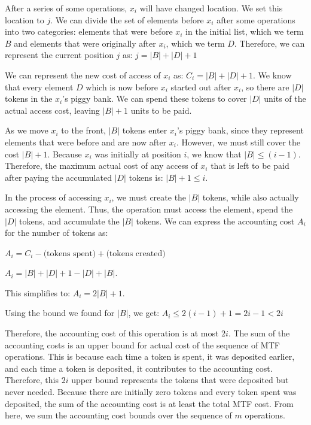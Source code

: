 \documentclass[11pt]{article}
\begin{document}
\begin{enumerate}
After a series of some operations, $x_i$ will have changed location. We set this location to $j$. 
We can divide the set of elements before $x_i$ after some operations into two categories: 
elements that were before $x_i$ in the initial list, which we term $B$ and elements that were originally after $x_i$, which we term $D$. 
Therefore, we can represent the current position $j$ as: $j = |B| + |D| + 1$

We can represent the new cost of access of $x_i$ as: $C_i = |B| + |D| + 1$. 
We know that every element $D$ which is now before $x_i$ started out after $x_i$, so there are $|D|$ tokens in the $x_i$'s piggy bank. 
We can spend these tokens to cover $|D|$ units of the actual access cost, leaving $|B| + 1$ units to be paid. 

As we move $x_i$ to the front, $|B|$ tokens enter $x_i$'s piggy bank, since they represent elements that were before and are now after $x_i$. 
However, we must still cover the cost $|B| + 1$. Because $x_i$ was initially at position $i$, we know that $|B| \leq (i-1)$. 
Therefore, the maximum actual cost of any access of $x_i$ that is left to be paid after paying the accumulated $|D|$ tokens is: $|B| + 1 \leq i$.

In the process of accessing $x_i$, we must create the $|B|$ tokens, while also actually accessing the element. 
Thus, the operation must access the element, spend the $|D|$ tokens, and accumulate the $|B|$ tokens. 
We can express the accounting cost $A_i$ for the number of tokens as: 

$A_i =  C_i - \text{(tokens spent)} + \text{(tokens created)}$  

$A_i = |B| + |D| + 1 - |D| + |B|$. 


This simplifies to: $A_i = 2|B| + 1$. 

Using the bound we found for $|B|$, we get: 
$A_i \leq 2(i - 1) + 1 = 2i - 1 < 2i$

Therefore, the accounting cost of this operation is at most $2i$. 
The sum of the accounting costs is an upper bound for actual cost of the sequence of MTF operations. 
This is because each time a token is spent, it was deposited earlier, and each time a token is deposited, it contributes to the accounting cost. 
Therefore, this $2i$ upper bound represents the tokens that were deposited but never needed. Because there are initially zero tokens 
and every token spent was deposited, the sum of the accounting cost is at least the total MTF cost. 
From here, we sum the accounting cost bounds over the sequence of $m$ operations.


\end{enumerate}
\end{document}

